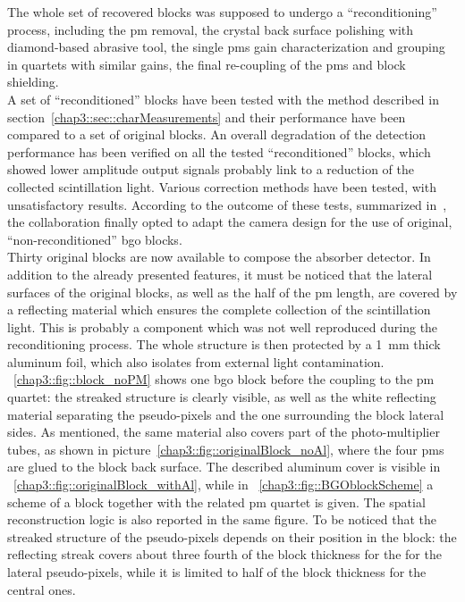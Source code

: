 The whole set of recovered blocks was supposed to undergo a \enquote{reconditioning} process, including the \gls{pm} removal, the crystal back surface polishing with diamond-based abrasive tool, the single \glspl{pm} gain characterization and grouping in quartets with similar gains, the final re-coupling of the \glspl{pm} and block shielding.\\ A set of \enquote{reconditioned} blocks have been tested with the method described in section~\ref{chap3::sec::charMeasurements} and their performance have been compared to a set of original blocks. An overall degradation of the detection performance has been verified on all the tested \enquote{reconditioned} blocks, which showed lower amplitude output signals probably link to a reduction of the collected scintillation light. Various correction methods have been tested, with unsatisfactory results. According to the outcome of these tests, summarized in~\cite{Sandjong2017}, the collaboration finally opted to adapt the camera design for the use of original, \enquote{non-reconditioned} \gls{bgo} blocks.\\    
Thirty original blocks are now available to compose the absorber detector. In addition to the already presented features, it must be noticed that the lateral surfaces of the original blocks, as well as the half of the \gls{pm} length, are covered by a reflecting material which ensures the complete collection of the scintillation light. This is probably a component which was not well reproduced during the reconditioning process. The whole structure is then protected by a 1~mm thick aluminum foil, which also isolates from external light contamination.\\
\figurename~\ref{chap3::fig::block_noPM} shows one \gls{bgo} block before the coupling to the \gls{pm} quartet: the streaked structure is clearly visible, as well as the white reflecting material separating the pseudo-pixels and the one surrounding the block lateral sides. As mentioned, the same material also covers part of the photo-multiplier tubes, as shown in picture~\ref{chap3::fig::originalBlock_noAl}, where the four \glspl{pm} are glued to the block back surface. The described aluminum cover is visible in \figurename~\ref{chap3::fig::originalBlock_withAl}, while in \figurename~\ref{chap3::fig::BGOblockScheme} a scheme of a block together with the related \gls{pm} quartet is given. The spatial reconstruction logic is also reported in the same figure. To be noticed that the streaked structure of the pseudo-pixels depends on their position in the block: the reflecting streak covers about three fourth of the block thickness for the for the lateral pseudo-pixels, while it is limited to half of the block thickness for the central ones.\\ 

